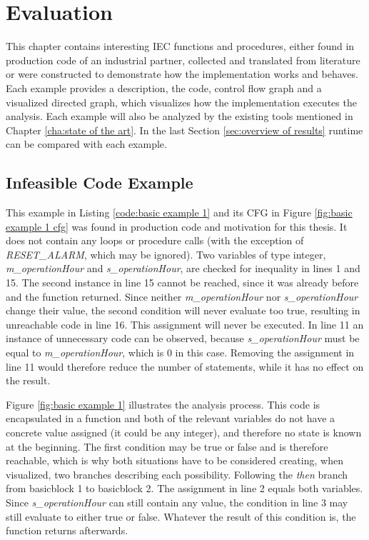 
\chapter {Evaluation}
\label {cha:evaluation}
This chapter contains interesting IEC functions and procedures, either found in production code of an industrial partner, collected and translated from literature or were constructed to demonstrate how the implementation works and behaves.
Each example provides a description, the code, control flow graph and a visualized directed graph, which visualizes how the implementation executes the analysis. Each example will also be analyzed by the existing tools mentioned in Chapter \ref{cha:state of the art}. In the last Section \ref{sec:overview of results} runtime can be compared with each example.

\section{Infeasible Code Example}
This example in Listing \ref{code:basic example 1} and its CFG in Figure \ref{fig:basic example 1 cfg} was found in production code and motivation for this thesis. It does not contain any loops or procedure calls (with the exception of \emph{RESET\_ALARM}, which may be ignored). Two variables of type integer, \emph{m\_operationHour} and \emph{s\_operationHour}, are checked for inequality in lines 1 and 15. The second instance in line 15 cannot be reached, since it was already before and the function returned. Since neither \emph{m\_operationHour} nor \emph{s\_operationHour} change their value, the second condition will never evaluate too true, resulting in unreachable code in line 16. This assignment will never be executed. 
In line 11 an instance of unnecessary code can be observed, because \emph{s\_operationHour} must be equal to \emph{m\_operationHour}, which is 0 in this case. Removing the assignment in line 11 would therefore reduce the number of statements, while it has no effect on the result.


Figure \ref{fig:basic example 1} illustrates the analysis process. This code is encapsulated in a function and both of the relevant variables do not have a concrete value assigned (it could be any integer), and therefore no state is known at the beginning. The first condition may be true or false and is therefore reachable, which is why both situations have to be considered creating, when visualized, two branches describing each possibility. Following the \emph{then} branch from basicblock 1 to basicblock 2. The assignment in line 2 equals both variables. Since \emph{s\_operationHour} can still contain any value, the condition in line 3 may still evaluate to either true or false. Whatever the result of this condition is, the function returns afterwards.

